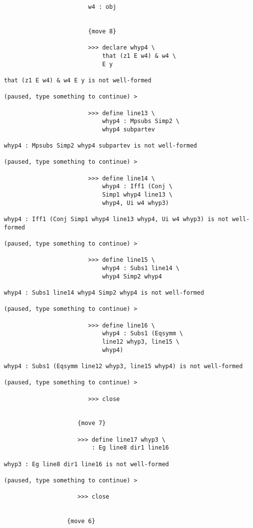 \documentclass[12pt]{article}
\begin{document}
\begin{verbatim}
                        w4 : obj


                        {move 8}

                        >>> declare whyp4 \
                            that (z1 E w4) & w4 \
                            E y

that (z1 E w4) & w4 E y is not well-formed

(paused, type something to continue) >

                        >>> define line13 \
                            whyp4 : Mpsubs Simp2 \
                            whyp4 subpartev

whyp4 : Mpsubs Simp2 whyp4 subpartev is not well-formed

(paused, type something to continue) >

                        >>> define line14 \
                            whyp4 : Iff1 (Conj \
                            Simp1 whyp4 line13 \
                            whyp4, Ui w4 whyp3)

whyp4 : Iff1 (Conj Simp1 whyp4 line13 whyp4, Ui w4 whyp3) is not well-formed

(paused, type something to continue) >

                        >>> define line15 \
                            whyp4 : Subs1 line14 \
                            whyp4 Simp2 whyp4

whyp4 : Subs1 line14 whyp4 Simp2 whyp4 is not well-formed

(paused, type something to continue) >

                        >>> define line16 \
                            whyp4 : Subs1 (Eqsymm \
                            line12 whyp3, line15 \
                            whyp4)

whyp4 : Subs1 (Eqsymm line12 whyp3, line15 whyp4) is not well-formed

(paused, type something to continue) >

                        >>> close


                     {move 7}

                     >>> define line17 whyp3 \
                         : Eg line8 dir1 line16

whyp3 : Eg line8 dir1 line16 is not well-formed

(paused, type something to continue) >

                     >>> close


                  {move 6}


\end{verbatim}
\end{document}
